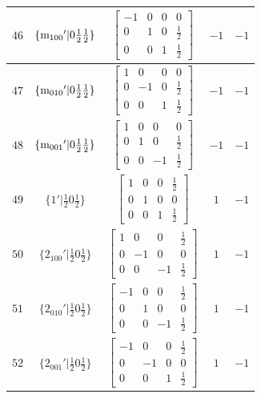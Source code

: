 \documentclass[fleqn,8pt]{jsarticle}
\begin{document}
\begin{longtable}{ccccc}
$ 46 $ & $ \{{\rm m}_{100}{}'|0 \frac{1}{2} \frac{1}{2}\} $ & $ \begin{bmatrix} -1 & 0 & 0 & 0 \\ 0 & 1 & 0 & \frac{1}{2} \\ 0 & 0 & 1 & \frac{1}{2} \end{bmatrix} $ & $ -1 $ & $ -1 $ \\ \hline
$ 47 $ & $ \{{\rm m}_{010}{}'|0 \frac{1}{2} \frac{1}{2}\} $ & $ \begin{bmatrix} 1 & 0 & 0 & 0 \\ 0 & -1 & 0 & \frac{1}{2} \\ 0 & 0 & 1 & \frac{1}{2} \end{bmatrix} $ & $ -1 $ & $ -1 $ \\ \hline
$ 48 $ & $ \{{\rm m}_{001}{}'|0 \frac{1}{2} \frac{1}{2}\} $ & $ \begin{bmatrix} 1 & 0 & 0 & 0 \\ 0 & 1 & 0 & \frac{1}{2} \\ 0 & 0 & -1 & \frac{1}{2} \end{bmatrix} $ & $ -1 $ & $ -1 $ \\ \hline
$ 49 $ & $ \{1{}'|\frac{1}{2} 0 \frac{1}{2}\} $ & $ \begin{bmatrix} 1 & 0 & 0 & \frac{1}{2} \\ 0 & 1 & 0 & 0 \\ 0 & 0 & 1 & \frac{1}{2} \end{bmatrix} $ & $ 1 $ & $ -1 $ \\ \hline
$ 50 $ & $ \{2{}_{100}{}'|\frac{1}{2} 0 \frac{1}{2}\} $ & $ \begin{bmatrix} 1 & 0 & 0 & \frac{1}{2} \\ 0 & -1 & 0 & 0 \\ 0 & 0 & -1 & \frac{1}{2} \end{bmatrix} $ & $ 1 $ & $ -1 $ \\ \hline
$ 51 $ & $ \{2{}_{010}{}'|\frac{1}{2} 0 \frac{1}{2}\} $ & $ \begin{bmatrix} -1 & 0 & 0 & \frac{1}{2} \\ 0 & 1 & 0 & 0 \\ 0 & 0 & -1 & \frac{1}{2} \end{bmatrix} $ & $ 1 $ & $ -1 $ \\ \hline
$ 52 $ & $ \{2{}_{001}{}'|\frac{1}{2} 0 \frac{1}{2}\} $ & $ \begin{bmatrix} -1 & 0 & 0 & \frac{1}{2} \\ 0 & -1 & 0 & 0 \\ 0 & 0 & 1 & \frac{1}{2} \end{bmatrix} $ & $ 1 $ & $ -1 $ \\ \hline

\end{longtable}
\end{document}
